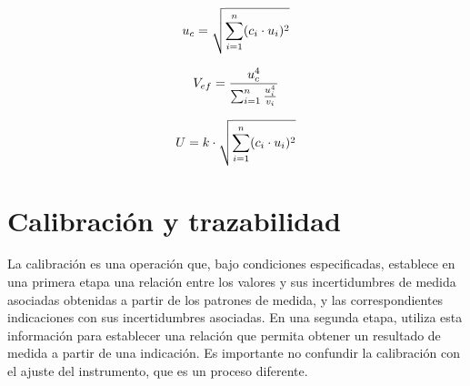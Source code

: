 \begin{equation}
    \centering
    u_c = \sqrt{\sum_{i=1}^{n} (c_i \cdot u_i)^2}
    \label{eq:incertidumbreCombinadaGral}
\end{equation}

\begin{equation}
    \centering
    V_{ef} = \frac{u_c^4}{\sum_{i=1}^{n} \frac{u_i^4}{v_i}}
    \label{eq:gradosDelibertadEfectivos}
\end{equation}



\begin{equation}
    \centering
    U = k \cdot \sqrt{\sum_{i=1}^{n} (c_i \cdot u_i)^2}
    \label{eq:incertidumbreExpandida}
\end{equation}

\section{Calibración y trazabilidad}\label{sec:trazabilidad}


La calibración es una operación que, bajo condiciones especificadas, establece en una primera etapa una relación entre los valores y sus incertidumbres de medida asociadas obtenidas a partir de los patrones de medida, y las correspondientes indicaciones con sus incertidumbres asociadas. En una segunda etapa, utiliza esta información para establecer una relación que permita obtener un resultado de medida a partir de una indicación. Es importante no confundir la calibración con el ajuste del instrumento, que es un proceso diferente.

